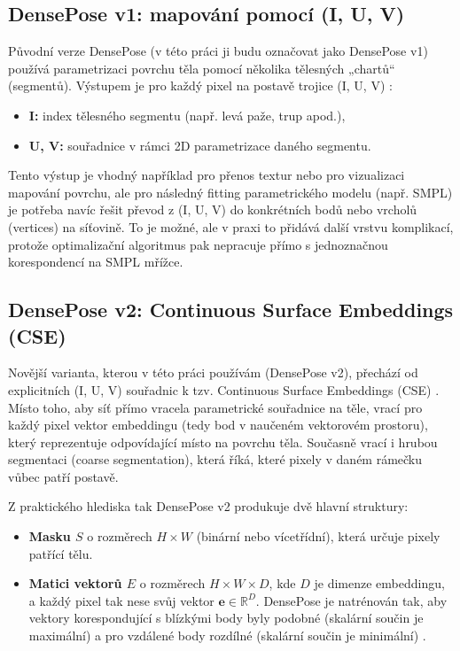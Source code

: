 \documentclass[11pt,a4paper,twoside,openright]{report}
\begin{document}
\subsection{DensePose v1: mapování pomocí (I, U, V)}

Původní verze DensePose (v této práci ji budu označovat jako DensePose v1) používá parametrizaci povrchu těla pomocí několika tělesných „chartů“ (segmentů). Výstupem je pro každý pixel na postavě trojice (I, U, V) \cite{guler2018densepose}:

\begin{itemize}
    \item \textbf{I:} index tělesného segmentu (např. levá paže, trup apod.),
    \item \textbf{U, V:} souřadnice v rámci 2D parametrizace daného segmentu.
\end{itemize}

Tento výstup je vhodný například pro přenos textur nebo pro vizualizaci mapování povrchu, ale pro následný fitting parametrického modelu (např. SMPL) je potřeba navíc řešit převod z (I, U, V) do konkrétních bodů nebo vrcholů (vertices) na síťovině. To je možné, ale v praxi to přidává další vrstvu komplikací, protože optimalizační algoritmus pak nepracuje přímo s jednoznačnou korespondencí na SMPL mřížce.

\subsection{DensePose v2: Continuous Surface Embeddings (CSE)}

Novější varianta, kterou v této práci používám (DensePose v2), přechází od explicitních (I, U, V) souřadnic k tzv. Continuous Surface Embeddings (CSE) \cite{le2024meshpose,wu2019detectron2}. Místo toho, aby síť přímo vracela parametrické souřadnice na těle, vrací pro každý pixel vektor embeddingu (tedy bod v naučeném vektorovém prostoru), který reprezentuje odpovídající místo na povrchu těla. Současně vrací i hrubou segmentaci (coarse segmentation), která říká, které pixely v daném rámečku vůbec patří postavě.

Z praktického hlediska tak DensePose v2 produkuje dvě hlavní struktury:

\begin{itemize}
    \item \textbf{Masku $S$} o rozměrech $H \times W$ (binární nebo vícetřídní), která určuje pixely patřící tělu.
    \item \textbf{Matici vektorů $E$} o rozměrech $H \times W \times D$, kde $D$ je dimenze embeddingu, a každý pixel tak nese svůj vektor $\mathbf{e} \in \mathbb{R}^D$. DensePose je natrénován tak, aby vektory korespondující s blízkými body byly podobné (skalární součin je maximální) a pro vzdálené body rozdílné (skalární součin je minimální) \cite{le2024meshpose}.
\end{itemize}
\end{document}
